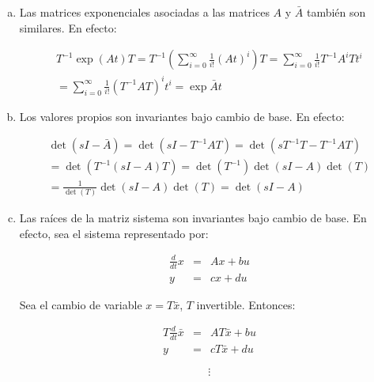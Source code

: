\begin{enumerate}[i)]
            \begin{enumerate}[a)]
                \item Las matrices exponenciales asociadas a las matrices $A$ y $\bar{A}$ también son similares. En efecto:

                \begin{multline}
                    T^{-1} \exp{(At)} T = T^{-1} \left( \sum\limits_{i=0}^{\infty} \frac{1}{i!} (A t)^i \right) T = \sum\limits_{i=0}^{\infty} \frac{1}{i!} T^{-1} A^i T t^i \\
                    = \sum\limits_{i=0}^{\infty} \frac{1}{i!} (T^{-1} A T)^i t^i = \exp{\bar{A} t} \nonumber
                \end{multline}

                \item Los valores propios son invariantes bajo cambio de base. En efecto:

                \begin{multline}
                    \det{(sI - \bar{A})} = \det{(sI - T^{-1} A T)} = \det{(s T^{-1} T - T^{-1} A T)} \\
                    = \det{(T^{-1} (sI - A) T)} = \det{(T^{-1})} \det{(sI - A)} \det{(T)} \\
                    = \frac{1}{\det{(T)}} \det{(sI - A)} \det{(T)} = \det{(sI - A)} \nonumber
                \end{multline}

                \item Las raíces de la matriz sistema son invariantes bajo cambio de base. En efecto, sea el sistema representado por:

                \begin{eqnarray}
                \frac{d}{dt} x & = & A x + b u \nonumber \\
                y & = & c x + d u \nonumber
                \end{eqnarray}

                Sea el cambio de variable $x = T \bar{x}$, $T$ invertible. Entonces:

                \begin{eqnarray}
                T \frac{d}{dt} \bar{x} & = & A T \bar{x} + b u \nonumber \\
                y & = & c T \bar{x} + d u \nonumber
                \end{eqnarray}

                \begin{equation}
                    \vdots \nonumber
                \end{equation}


\end{enumerate}
\end{enumerate}

